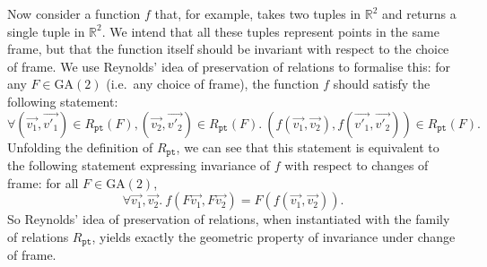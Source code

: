 \documentclass{article}
\newcommand{\GA}{\mathrm{GA}}
\begin{document}
Now consider a function $f$ that, for example, takes two tuples in
$\mathbb{R}^2$ and returns a single tuple in $\mathbb{R}^2$. We intend
that all these tuples represent points in the same frame, but that the
function itself should be invariant with respect to the choice of
frame. We use Reynolds' idea of preservation of relations to formalise
this: for any $F \in \GA(2)$ (i.e.~any choice of frame), the function
$f$ should satisfy the following statement:
\begin{equation}\label{eq:f-preserve-rel-frame}
  \forall (\vec{v_1},\vec{v'_1}) \in R_{\texttt{pt}}(F), (\vec{v_2},\vec{v'_2}) \in R_{\texttt{pt}}(F).\ (f(\vec{v_1}, \vec{v_2}), f(\vec{v'_1}, \vec{v'_2})) \in R_{\texttt{pt}}(F).
\end{equation}
Unfolding the definition of $R_{\texttt{pt}}$, we can see that this
statement is equivalent to the following statement expressing
invariance of $f$ with respect to changes of frame: for all $F \in
\GA(2)$,
\begin{equation}\label{eq:f-invariant-frame}
  \forall \vec{v_1}, \vec{v_2}.\ f(F\vec{v_1},F\vec{v_2}) = F(f(\vec{v_1},\vec{v_2})).
\end{equation}
So Reynolds' idea of preservation of relations, when instantiated with
the family of relations $R_{\texttt{pt}}$, yields exactly the
geometric property of invariance under change of frame.
\end{document}
